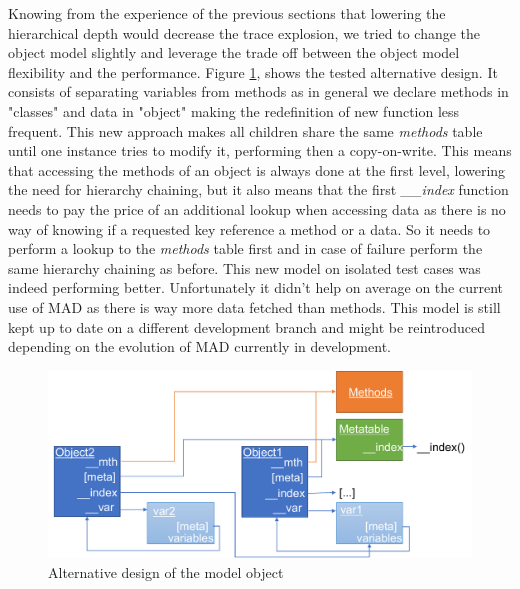 
Knowing from the experience of the previous sections that lowering the
hierarchical depth would decrease the trace explosion, we tried to change the
object model slightly and leverage the trade off between the object model
flexibility and the performance. Figure \ref{fig:MO-alt-desc}, shows the tested
alternative design. It consists of separating variables from methods as in
general we declare methods in "classes" and data in "object" making the
redefinition of new function less frequent. This new approach makes all children
share the same \emph{methods} table until one instance tries to modify it,
performing then a copy-on-write. This means that accessing the methods of an
object is always done at the first level, lowering the need for hierarchy
chaining, but it also means that the first \emph{\_\_index} function needs to
pay the price of an additional lookup when accessing data as there is no way
of knowing if a requested key reference a method or a data. So it needs to perform
a lookup to the \emph{methods} table first and in case of failure perform the
same hierarchy chaining as before. This new model on isolated test cases was
indeed performing better. Unfortunately it didn't help on average on the current
use of MAD as there is way more data fetched than methods. This model is still
kept up to date on a different development branch and might be reintroduced
depending on the evolution of MAD currently in development.

\begin{figure}
    \centering
    \includegraphics[width=\textwidth]{./Images/MO2.pdf}
    \caption{Alternative design of the model object}
    \label{fig:MO-alt-desc}
\end{figure}

